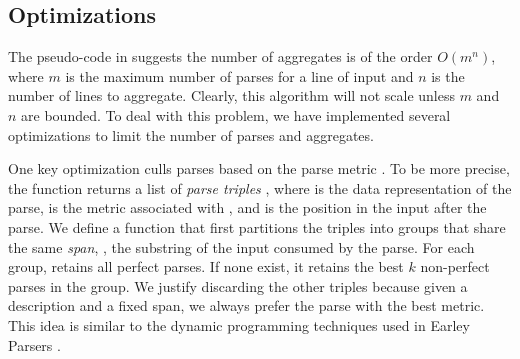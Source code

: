 
\subsection{Optimizations}
The pseudo-code in  suggests the number of
aggregates is of the order $O(m ^ n)$, where $m$ is the maximum number of
parses for a line of input  and $n$ is the number of lines to
aggregate.  Clearly, this algorithm will not scale 
unless $m$ and $n$ are bounded.  To deal with this problem,
we have implemented several optimizations to limit the number of 
parses and aggregates. 

One key optimization culls parses based on 
the parse metric . 
To be more precise, the  function returns a list of
{\em parse triples} , where  is the data representation of
the parse,  is the metric associated with , and
 is the position in the input after the parse.
We define a  function that first partitions the
triples into groups that share the same 
{\em span}, \ie{}, the substring of the input consumed by the parse.
For each group,  retains all perfect parses. If 
none exist, it retains the best $k$ non-perfect parses in the group. 
We justify discarding the other triples because
given a description  and a fixed span, we always
prefer the parse with the best metric. This idea is
similar to the dynamic programming techniques used in 
Earley Parsers \cite{earley-parser}. 

